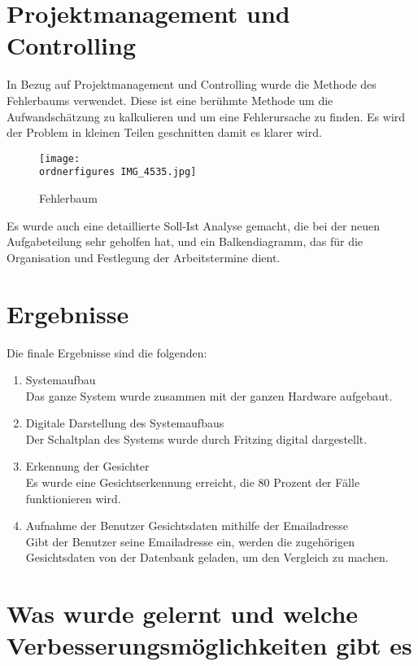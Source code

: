	\section{Projektmanagement und Controlling}
	In Bezug auf Projektmanagement und Controlling wurde die Methode des Fehlerbaums verwendet. Diese ist eine ber{\"u}hmte Methode um die Aufwandsch{\"a}tzung zu kalkulieren und um eine Fehlerursache zu finden. Es wird der Problem in kleinen Teilen geschnitten damit es klarer wird. 
	\begin{figure}		\texttt{[image: \\ordnerfigures IMG\_4535.jpg]}
		\caption{Fehlerbaum}
	\end{figure}
	Es wurde auch eine detaillierte Soll-Ist Analyse gemacht, die bei der neuen Aufgabeteilung sehr geholfen hat, und ein Balkendiagramm, das f{\"u}r die Organisation und Festlegung der Arbeitstermine dient.
	
	\section{Ergebnisse}
	Die finale Ergebnisse sind die folgenden:\\
	\begin{enumerate}
		\item Systemaufbau \\
		Das ganze System wurde zusammen mit der ganzen Hardware aufgebaut.
		\item Digitale Darstellung des Systemaufbaus\\
		Der Schaltplan des Systems wurde durch Fritzing digital dargestellt.
		\item Erkennung der Gesichter \\
		Es wurde eine Gesichtserkennung erreicht, die 80 Prozent der Fälle funktionieren wird.
		\item Aufnahme der Benutzer Gesichtsdaten mithilfe der Emailadresse\\
		Gibt der Benutzer seine Emailadresse ein, werden die zugehörigen Gesichtsdaten von der Datenbank geladen, um den Vergleich zu machen.
	\end{enumerate}

\section{Was wurde gelernt und welche Verbesserungsmöglichkeiten gibt es}

